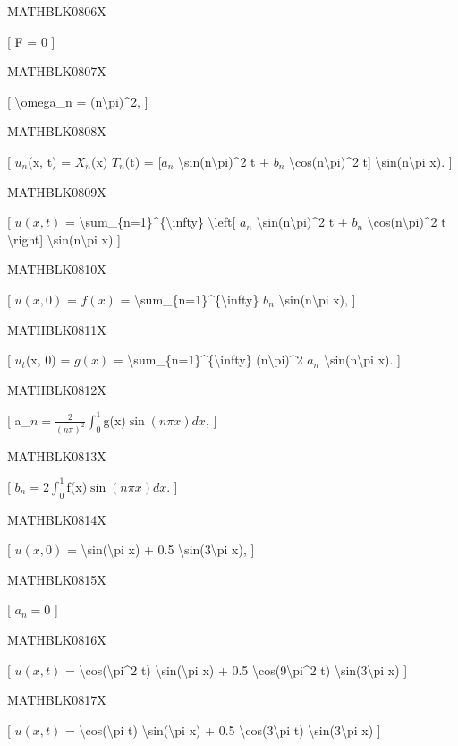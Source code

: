 \documentclass[
]{article}
\begin{document}
{{MATHBLK0806X

{[} F = 0 {]}

MATHBLK0807X

{[} \textbackslash omega\_n = (n\textbackslash pi)\^{}2, {]}

MATHBLK0808X

{[} \(u_n\)(x, t) = \(X_n\)(x) \(T_n\)(t) = {[}\(a_n\)
\textbackslash sin(n\textbackslash pi)\^{}2 t + \(b_n\)
\textbackslash cos(n\textbackslash pi)\^{}2 t{]}
\textbackslash sin(n\textbackslash pi x). {]}

MATHBLK0809X

{[} \(u(x, t)\) =
\textbackslash sum\_\{n=1\}\^{}\{\textbackslash infty\}
\textbackslash left{[} \(a_n\)
\textbackslash sin(n\textbackslash pi)\^{}2 t + \(b_n\)
\textbackslash cos(n\textbackslash pi)\^{}2 t \textbackslash right{]}
\textbackslash sin(n\textbackslash pi x) {]}

MATHBLK0810X

{[} \(u(x, 0)\) = \(f(x)\) =
\textbackslash sum\_\{n=1\}\^{}\{\textbackslash infty\} \(b_n\)
\textbackslash sin(n\textbackslash pi x), {]}

MATHBLK0811X

{[} \(u_t\)(x, 0) = \(g(x)\) =
\textbackslash sum\_\{n=1\}\^{}\{\textbackslash infty\}
(n\textbackslash pi)\^{}2 \(a_n\) \textbackslash sin(n\textbackslash pi
x). {]}

MATHBLK0812X

{[} a\_\(n = \frac{2}{(n\pi)^2} \int_0^1\)g(x)\(\sin(n\pi x) dx\), {]}

MATHBLK0813X

{[} \(b_n = 2 \int_0^1\)f(x)\(\sin(n\pi x) dx\). {]}

MATHBLK0814X

{[} \(u(x, 0)\) = \textbackslash sin(\textbackslash pi x) + 0.5
\textbackslash sin(3\textbackslash pi x), {]}

MATHBLK0815X

{[} \(a_n=0\) {]}

MATHBLK0816X

{[} \(u(x, t)\) = \textbackslash cos(\textbackslash pi\^{}2 t)
\textbackslash sin(\textbackslash pi x) + 0.5
\textbackslash cos(9\textbackslash pi\^{}2 t)
\textbackslash sin(3\textbackslash pi x) {]}

MATHBLK0817X

{[} \(u(x, t)\) = \textbackslash cos(\textbackslash pi t)
\textbackslash sin(\textbackslash pi x) + 0.5
\textbackslash cos(3\textbackslash pi t)
\textbackslash sin(3\textbackslash pi x) {]}

}}
\end{document}
